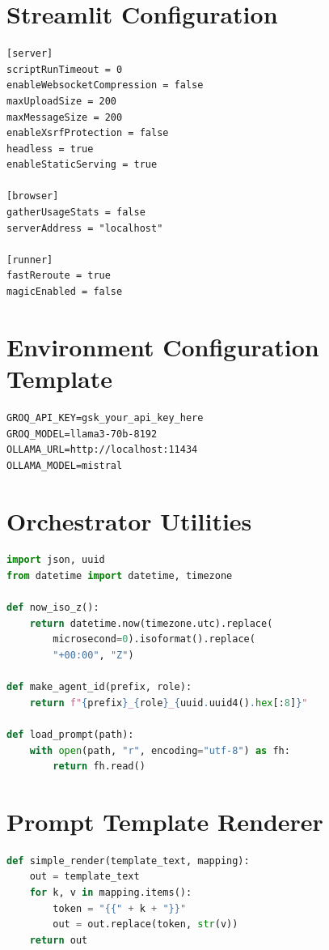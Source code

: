 \section{Streamlit Configuration}

\begin{lstlisting}[caption={.streamlit/config.toml --- Server Configuration}, label={lst:config}]
[server]
scriptRunTimeout = 0
enableWebsocketCompression = false
maxUploadSize = 200
maxMessageSize = 200
enableXsrfProtection = false
headless = true
enableStaticServing = true

[browser]
gatherUsageStats = false
serverAddress = "localhost"

[runner]
fastReroute = true
magicEnabled = false
\end{lstlisting}

\section{Environment Configuration Template}

\begin{lstlisting}[caption={.env.example --- API Key Configuration}, label={lst:env}]
GROQ_API_KEY=gsk_your_api_key_here
GROQ_MODEL=llama3-70b-8192
OLLAMA_URL=http://localhost:11434
OLLAMA_MODEL=mistral
\end{lstlisting}

\section{Orchestrator Utilities}

\begin{lstlisting}[language=Python, caption={orchestrator/utils.py --- Shared Utilities}, label={lst:utils}]
import json, uuid
from datetime import datetime, timezone

def now_iso_z():
    return datetime.now(timezone.utc).replace(
        microsecond=0).isoformat().replace(
        "+00:00", "Z")

def make_agent_id(prefix, role):
    return f"{prefix}_{role}_{uuid.uuid4().hex[:8]}"

def load_prompt(path):
    with open(path, "r", encoding="utf-8") as fh:
        return fh.read()
\end{lstlisting}

\section{Prompt Template Renderer}

\begin{lstlisting}[language=Python, caption={agents/prompt\_helpers.py --- Template Engine}, label={lst:prompt}]
def simple_render(template_text, mapping):
    out = template_text
    for k, v in mapping.items():
        token = "{{" + k + "}}"
        out = out.replace(token, str(v))
    return out
\end{lstlisting}
